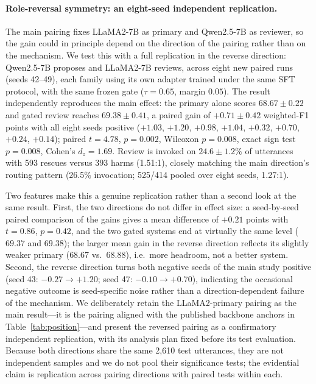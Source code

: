 \documentclass[final,5p,times,twocolumn]{elsarticle}
\begin{document}
\paragraph{Role-reversal symmetry: an eight-seed independent replication.}
The main pairing fixes LLaMA2-7B as primary and Qwen2.5-7B as reviewer, so
the gain could in principle depend on the direction of the pairing rather
than on the mechanism. We test this with a full replication in the reverse
direction: Qwen2.5-7B proposes and LLaMA2-7B reviews, across eight new
paired runs (seeds 42--49), each family using its own adapter trained under
the same SFT protocol, with the same frozen gate ($\tau{=}0.65$, margin
$0.05$). The result independently reproduces the main effect: the primary
alone scores $68.67 \pm 0.22$ and gated review reaches $69.38 \pm 0.41$, a
paired gain of $\mathbf{+0.71 \pm 0.42}$ weighted-F1 points with all eight
seeds positive ($+1.03$, $+1.20$, $+0.98$, $+1.04$, $+0.32$, $+0.70$,
$+0.24$, $+0.14$); paired $t{=}4.78$, $p{=}0.002$, Wilcoxon $p{=}0.008$,
exact sign test $p{=}0.008$, Cohen's $d_z{=}1.69$. Review is invoked on
$24.6 \pm 1.2\%$ of utterances with 593 rescues versus 393 harms
(1.51:1), closely matching the main direction's routing pattern (26.5\%
invocation; 525/414 pooled over eight seeds, 1.27:1).

Two features make this a genuine replication rather than a second look at
the same result. First, the two directions do not differ in effect size: a
seed-by-seed paired comparison of the gains gives a mean difference of
$+0.21$ points with $t{=}0.86$, $p{=}0.42$, and the two gated systems end at
virtually the same level ($69.37$ and $69.38$); the larger mean gain in the
reverse direction reflects its slightly weaker primary ($68.67$ vs.\
$68.88$), i.e.\ more headroom, not a better system. Second, the reverse
direction turns both negative seeds of the main study positive (seed 43:
$-0.27 \to +1.20$; seed 47: $-0.10 \to +0.70$), indicating the occasional
negative outcome is seed-specific noise rather than a direction-dependent
failure of the mechanism. We deliberately retain the LLaMA2-primary pairing
as the main result---it is the pairing aligned with the published backbone
anchors in Table~\ref{tab:position}---and present the reversed pairing as a
confirmatory independent replication, with its analysis plan fixed
before its test evaluation. Because both directions share the
same 2{,}610 test utterances, they are not independent samples and we do not
pool their significance tests; the evidential claim is replication across
pairing directions with paired tests within each.
\end{document}
